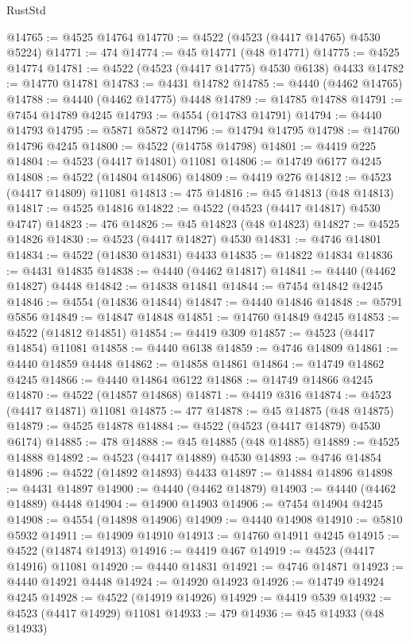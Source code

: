 \begin{lexlean}{RustStd}
\begin{coremodule}
@14765 := @4525 @14764
@14770 := @4522 (@4523 (@4417 @14765) @4530 @5224)
@14771 := 474
@14774 := @45 @14771 (@48 @14771)
@14775 := @4525 @14774
@14781 := @4522 (@4523 (@4417 @14775) @4530 @6138) @4433
@14782 := @14770 @14781
@14783 := @4431 @14782
@14785 := @4440 (@4462 @14765)
@14788 := @4440 (@4462 @14775) @4448
@14789 := @14785 @14788
@14791 := @7454 @14789 @4245
@14793 := @4554 (@14783 @14791)
@14794 := @4440 @14793
@14795 := @5871 @5872
@14796 := @14794 @14795
@14798 := @14760 @14796 @4245
@14800 := @4522 (@14758 @14798)
@14801 := @4419 @225
@14804 := @4523 (@4417 @14801) @11081
@14806 := @14749 @6177 @4245
@14808 := @4522 (@14804 @14806)
@14809 := @4419 @276
@14812 := @4523 (@4417 @14809) @11081
@14813 := 475
@14816 := @45 @14813 (@48 @14813)
@14817 := @4525 @14816
@14822 := @4522 (@4523 (@4417 @14817) @4530 @4747)
@14823 := 476
@14826 := @45 @14823 (@48 @14823)
@14827 := @4525 @14826
@14830 := @4523 (@4417 @14827) @4530
@14831 := @4746 @14801
@14834 := @4522 (@14830 @14831) @4433
@14835 := @14822 @14834
@14836 := @4431 @14835
@14838 := @4440 (@4462 @14817)
@14841 := @4440 (@4462 @14827) @4448
@14842 := @14838 @14841
@14844 := @7454 @14842 @4245
@14846 := @4554 (@14836 @14844)
@14847 := @4440 @14846
@14848 := @5791 @5856
@14849 := @14847 @14848
@14851 := @14760 @14849 @4245
@14853 := @4522 (@14812 @14851)
@14854 := @4419 @309
@14857 := @4523 (@4417 @14854) @11081
@14858 := @4440 @6138
@14859 := @4746 @14809
@14861 := @4440 @14859 @4448
@14862 := @14858 @14861
@14864 := @14749 @14862 @4245
@14866 := @4440 @14864 @6122
@14868 := @14749 @14866 @4245
@14870 := @4522 (@14857 @14868)
@14871 := @4419 @316
@14874 := @4523 (@4417 @14871) @11081
@14875 := 477
@14878 := @45 @14875 (@48 @14875)
@14879 := @4525 @14878
@14884 := @4522 (@4523 (@4417 @14879) @4530 @6174)
@14885 := 478
@14888 := @45 @14885 (@48 @14885)
@14889 := @4525 @14888
@14892 := @4523 (@4417 @14889) @4530
@14893 := @4746 @14854
@14896 := @4522 (@14892 @14893) @4433
@14897 := @14884 @14896
@14898 := @4431 @14897
@14900 := @4440 (@4462 @14879)
@14903 := @4440 (@4462 @14889) @4448
@14904 := @14900 @14903
@14906 := @7454 @14904 @4245
@14908 := @4554 (@14898 @14906)
@14909 := @4440 @14908
@14910 := @5810 @5932
@14911 := @14909 @14910
@14913 := @14760 @14911 @4245
@14915 := @4522 (@14874 @14913)
@14916 := @4419 @467
@14919 := @4523 (@4417 @14916) @11081
@14920 := @4440 @14831
@14921 := @4746 @14871
@14923 := @4440 @14921 @4448
@14924 := @14920 @14923
@14926 := @14749 @14924 @4245
@14928 := @4522 (@14919 @14926)
@14929 := @4419 @539
@14932 := @4523 (@4417 @14929) @11081
@14933 := 479
@14936 := @45 @14933 (@48 @14933)

\end{coremodule}
\end{lexlean}

